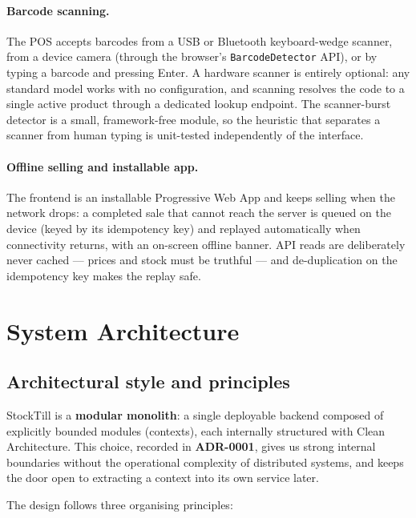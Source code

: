 \documentclass[11pt,a4paper]{article}
\begin{document}
\paragraph{Barcode scanning.} The POS accepts barcodes from a USB or Bluetooth keyboard-wedge
scanner, from a device camera (through the browser's \texttt{BarcodeDetector} API), or by typing a
barcode and pressing Enter. A hardware scanner is entirely optional: any standard model works with
no configuration, and scanning resolves the code to a single active product through a dedicated
lookup endpoint. The scanner-burst detector is a small, framework-free module, so the heuristic that
separates a scanner from human typing is unit-tested independently of the interface.

\paragraph{Offline selling and installable app.} The frontend is an installable Progressive Web
App and keeps selling when the network drops: a completed sale that cannot reach the server is
queued on the device (keyed by its idempotency key) and replayed automatically when connectivity
returns, with an on-screen offline banner. API reads are deliberately never cached --- prices and stock
must be truthful --- and de-duplication on the idempotency key makes the replay safe.

\section{System Architecture}
\label{sec:architecture}

\subsection{Architectural style and principles}

StockTill is a \textbf{modular monolith}: a single deployable backend composed of explicitly
bounded modules (contexts), each internally structured with Clean Architecture. This choice, recorded
in \textbf{ADR-0001}, gives us strong internal boundaries without the operational complexity of
distributed systems, and keeps the door open to extracting a context into its own service later.

The design follows three organising principles:
\end{document}

